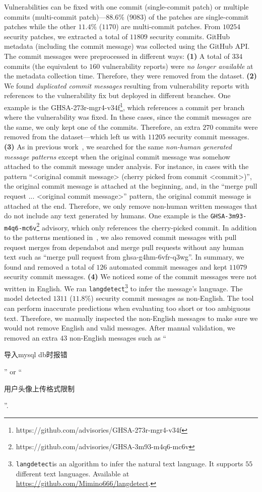 Vulnerabilities can be fixed with one commit (single-commit patch) or multiple commits (multi-commit patch)---$88.6\%$ ($9083$) of the patches are single-commit patches while the other $11.4\%$ ($1170$) are multi-commit patches. From $10254$ security patches, we extracted a total of $11809$ security commits. GitHub metadata (including the commit message) was collected using the GitHub API. The commit messages were preprocessed in different ways: \textbf{(1)} A total of $334$  
commits (the equivalent to $160$ vulnerability reports) were \emph{no longer available} at the metadata collection time. Therefore, they were removed from the dataset. \textbf{(2)} We found \emph{duplicated commit messages} resulting from vulnerability reports with references to the vulnerability fix but deployed in different branches. One example is the GHSA-273r-mgr4-v34f\footnote{https://github.com/advisories/GHSA-273r-mgr4-v34f}, which references a commit per branch where the vulnerability was fixed. In these cases, since the commit messages are the same, we only kept one of the commits. Therefore, an extra $270$ commits were removed from the dataset---which left us with $11205$ security commit messages. \textbf{(3)} As in previous work~\cite{Tian_2022}, we searched for the same \emph{non-human generated message patterns} except when the original commit message was somehow attached to the commit message under analysis. For instance, in cases with the pattern ``<original commit message> (cherry picked from commit <commit>)'', the original commit message is attached at the beginning, and, in the ``merge pull request ... <original commit message>'' pattern, the original commit message is attached at the end. Therefore, we only remove non-human written messages that do not include any text generated by humans. One example is the \texttt{GHSA-3m93-m4q6-mc6v}\footnote{https://github.com/advisories/GHSA-3m93-m4q6-mc6v} advisory, which only references the cherry-picked commit. In addition to the patterns mentioned in~\cite{Tian_2022}, we also removed commit messages with pull request merges from dependabot and merge pull requests without any human text such as ``merge pull request from ghsa-g4hm-6vfr-q3wg''.
In summary, we found and removed a total of $126$ automated commit messages and kept $11079$ security commit messages. \textbf{(4)} We noticed some of the 
commit messages were not written in English. We ran \texttt{langdetect}\footnote{\texttt{langdetect}is an algorithm to infer the natural text language. It supports $55$ different text languages. Available at \url{https://github.com/Mimino666/langdetect}.} to infer the message's language. The model detected $1311$ ($11.8\%$) security commit messages as non-English. The tool can perform inaccurate predictions when evaluating too short or too ambiguous text. Therefore, we manually inspected the non-English messages to make sure we would not remove English and valid messages. 
After manual validation, we removed an extra $43$ non-English messages such as ``\begin{CJK*}{UTF8}{gbsn}导入mysql db时报错\end{CJK*}'' or ``\begin{CJK*}{UTF8}{gbsn}用户头像上传格式限制\end{CJK*}''.

